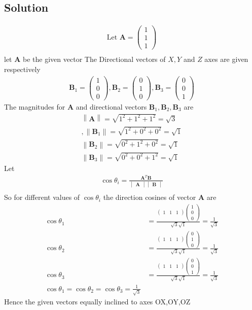 \documentclass[12pt]{article}
\newcommand{\mydet}[1]{\ensuremath{\begin{vmatrix}#1\end{vmatrix}}}
\providecommand{\norm}[1]{\left\lVert#1\right\rVert}
\newcommand{\myvec}[1]{\ensuremath{\begin{pmatrix}#1\end{pmatrix}}}
\let\vec\mathbf
\begin{document}
\begin{enumerate}
\section{Solution}
\begin{align}
\text{Let } \vec{A} = \myvec{1\\1\\1}\\  
\end{align}
let $\vec{A}$ be the given vector
The Directional vectors of $X,Y$ and $Z$ axes are given respectively 
\begin{align}
		\vec{B}_1 =\myvec{1\\0\\0},\vec{B}_2=\myvec{0\\1\\0},\vec{B}_3 =\myvec{0\\0\\1}
\end{align}
		The magnitudes for $\vec{A}$ and directional vectors $\vec{B}_1,\vec{B}_2,\vec{B}_3$ are
	\begin{align}
\norm{\vec{A}} =\sqrt{1^2+1^2+1^2}=\sqrt{3}\\,\norm{\vec{B}_1}=\sqrt{1^2+0^2+0^2}=\sqrt{1}\\ \norm{\vec{B}_2}=\sqrt{0^2+1^2+0^2}=\sqrt{1}\\
\norm{\vec{B}_3}=\sqrt{0^2+0^2+1^2}=\sqrt{1}
	\end{align}
Let 
\begin{align}
	\cos\theta_i=\frac{\vec{A}^{T}\vec{B}}{\mydet{\vec{A}}\mydet{\vec{B}}}\\  
\end{align}
		So for different values of $\cos\theta_i$ the direction cosines of vector $\vec{A}$ are
\begin{align}
	\cos\theta_1 &=\frac{\myvec{1&1&1}\myvec{1\\0\\0}}{\sqrt{3}\sqrt{1}}=\frac{1}{\sqrt{3}}\\
	\cos\theta_2 &=\frac{\myvec{1&1&1}\myvec{0\\1\\0}}{\sqrt{3}\sqrt{1}}=\frac{1}{\sqrt{3}}\\
	\cos\theta_3 &=\frac{\myvec{1&1&1}\myvec{0\\0\\1}}{\sqrt{3}\sqrt{1}}=\frac{1}{\sqrt{3}}\\
	\cos\theta_1=\cos\theta_2=\cos\theta_3=\frac{1}{\sqrt{3}}
\end{align}
Hence the given vectors equally inclined to axes OX,OY,OZ
\end{enumerate}
\end{document}
